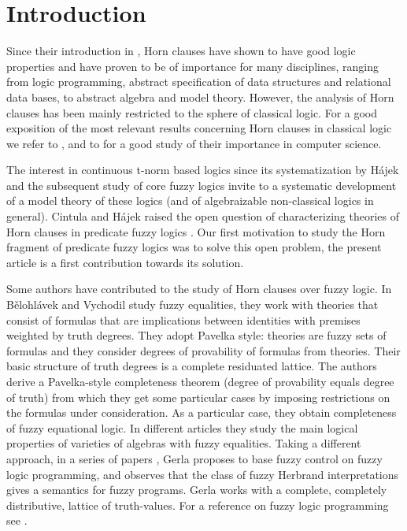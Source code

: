 \documentclass{IOS-Book-Article}
\begin{document}
\section{Introduction}
\label{Introduction} 

Since their introduction in \cite{Kin43}, Horn clauses have shown to have good logic properties and have proven to be of importance for many disciplines, ranging from logic programming, abstract specification of data structures and relational data bases, to abstract algebra and model theory. However, the analysis of Horn clauses has been mainly restricted to the sphere of classical logic. For a good exposition of the most relevant results concerning Horn clauses in classical logic we refer to \cite{Hod93}, and to \cite{Mak87} for a good study of their importance in computer science. 

The interest in continuous t-norm based logics since its systematization by H\'ajek  \cite{Ha98} and the subsequent study of core fuzzy logics \cite{CiHa10} invite to a systematic development of a model theory of these logics (and of algebraizable non-classical logics in general). Cintula and H\'ajek raised the open question of characterizing theories of Horn clauses in predicate fuzzy logics \cite{CiHa10}. Our first motivation to study the Horn fragment of predicate fuzzy logics was to solve this open problem, the present article is a first contribution towards its solution.

Some authors have contributed to the study of Horn clauses over fuzzy logic. In \cite{Be02,Be03,BeVy05,BeVic06,BeVic06b,Vy15} B\v{e}lohl\'avek and Vychodil study fuzzy equalities, they work with theories that consist of formulas that are implications between identities with premises weighted by truth
degrees. They adopt Pavelka style: theories are fuzzy sets of formulas and they consider degrees
of provability of formulas from theories. Their basic structure of truth degrees is a complete
residuated lattice. The authors derive a Pavelka-style completeness theorem (degree of provability
equals degree of truth) from which they get some particular cases by imposing restrictions
on the formulas under consideration. As a particular case, they obtain completeness of fuzzy
equational logic. In different articles they study the main logical properties of varieties of algebras with fuzzy equalities. Taking a different approach, in a series of papers \cite{Ge01b, Ge01,Ge05}, Gerla proposes to base fuzzy control on fuzzy logic programming, and observes that the class of fuzzy Herbrand interpretations gives a semantics for fuzzy programs. Gerla works with a complete, completely distributive, lattice of truth-values. For a reference on fuzzy logic programming see \cite{Voj01, Ebra01}.
\end{document}
